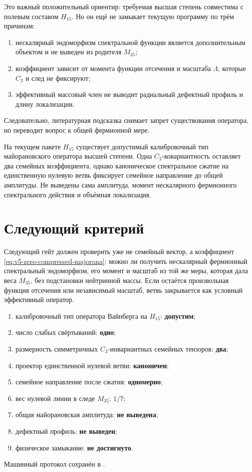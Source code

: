 Это важный положительный ориентир: требуемая высшая степень совместима с
полевым составом $H_{15}$. Но он ещё не замыкает текущую программу по трём
причинам:
\begin{enumerate}
 \item нескалярный эндоморфизм спектральной функции является дополнительным
 объектом и не выведен из родителя $M_{35}$;
 \item коэффициент зависит от момента функции отсечения и масштаба
 $\Lambda$, которые $C_3$ и след не фиксируют;
 \item эффективный массовый член не выводит радиальный дефектный профиль и
 длину локализации.
\end{enumerate}

Следовательно, литературная подсказка снимает запрет существования
оператора, но переводит вопрос к общей фермионной мере.

\begin{theorem}
На текущем пакете $H_{15}$ существует допустимый калибровочный тип
майорановского оператора высшей степени. Одна $C_3$-ковариантность оставляет
два семейных коэффициента, однако каноническое спектральное сжатие на
единственную нулевую ветвь фиксирует семейное направление до общей
амплитуды. Не выведены сама амплитуда, момент нескалярного фермионного
спектрального действия и объёмная локализация.
\end{theorem}

\section{Следующий критерий}

Следующий гейт должен проверить уже не семейный вектор, а коэффициент
\eqref{eq:v5-zero-compressed-majorana}: можно ли получить нескалярный
фермионный спектральный эндоморфизм, его момент и масштаб из той же меры,
которая дала веса $M_{35}$, без подстановки нейтринной массы. Если остаётся
произвольная функция отсечения или независимый масштаб, ветвь закрывается
как условный эффективный оператор.

\begin{protocol}
\begin{enumerate}
 \item калибровочный тип оператора Вайнберга на $H_{15}$:
 \textbf{допустим};
 \item число слабых свёртываний: \textbf{одно};
 \item размерность симметричных $C_3$-инвариантных семейных тензоров:
 \textbf{два};
 \item проектор единственной нулевой ветви: \textbf{каноничен};
 \item семейное направление после сжатия: \textbf{одномерно};
 \item вес нулевой линии в следе $M_{35}$: \textbf{$1/7$};
 \item общая майорановская амплитуда: \textbf{не выведена};
 \item дефектный профиль: \textbf{не выведен};
 \item физическое замыкание: \textbf{не достигнуто}.
\end{enumerate}
\end{protocol}

Машинный протокол сохранён в
.